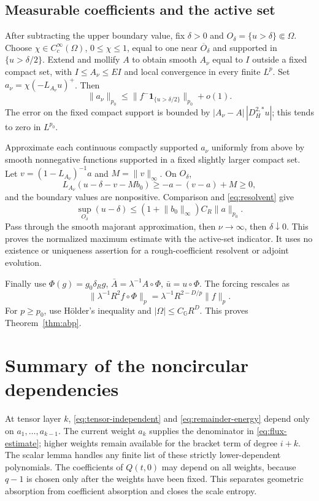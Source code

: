 \documentclass[11pt,a4paper]{amsart}
\numberwithin{equation}{section}
\theoremstyle{remark}\newtheorem{remark}[theorem]{Remark}
\newcommand{\G}{\mathbb G}
\newcommand{\norm}[1]{\lVert #1\rVert}
\begin{document}
\subsection{Measurable coefficients and the active set}
After subtracting the upper boundary value, fix $\delta>0$ and
$O_\delta=\{u>\delta\}\Subset\Omega$. Choose $\chi\in C_c^\infty(\Omega)$,
$0\le\chi\le1$, equal to one near $\overline O_\delta$ and supported in
$\{u>\delta/2\}$. Extend and mollify $A$ to obtain smooth $A_\nu$ equal to
$I$ outside a fixed compact set, with $I\le A_\nu\le EI$ and local convergence
in every finite $L^p$. Set $a_\nu=\chi(-L_{A_\nu}u)^+$. Then
\begin{equation}\label{eq:rough-limit}
 \norm{a_\nu}_{p_0}
 \le\norm{f^-\mathbf1_{\{u>\delta/2\}}}_{p_0}+o(1).
\end{equation}
The error on the fixed compact support is bounded by
$|A_\nu-A|\,|D_H^{2,*}u|$; this tends to zero in $L^{p_0}$.

Approximate each continuous compactly supported $a_\nu$ uniformly from above
by smooth nonnegative functions supported in a fixed slightly larger compact
set. Let $v=(1-L_{A_\nu})^{-1}a$ and $M=\norm v_\infty$. On $O_\delta$,
\[
 L_{A_\nu}(u-\delta-v-Mb_0)\ge-a-(v-a)+M\ge0,
\]
and the boundary values are nonpositive. Comparison and
\eqref{eq:resolvent} give
\[
 \sup_{O_\delta}(u-\delta)\le(1+\norm{b_0}_\infty)C_R\norm a_{p_0}.
\]
Pass through the smooth majorant approximation, then $\nu\to\infty$, then
$\delta\downarrow0$. This proves the normalized maximum estimate with the
active-set indicator. It uses no existence or uniqueness assertion for a
rough-coefficient resolvent or adjoint evolution.

Finally use $\Phi(g)=g_0\delta_Rg$, $\bar A=\lambda^{-1}A\circ\Phi$,
$\bar u=u\circ\Phi$. The forcing rescales as
\[
 \norm{\lambda^{-1}R^2f\circ\Phi}_p
 =\lambda^{-1}R^{2-D/p}\norm f_p.
\]
For $p\ge p_0$, use H\"older's inequality and $|\Omega|\le C_\G R^D$.
This proves Theorem~\ref{thm:abp}.

\section{Summary of the noncircular dependencies}
At tensor layer $k$, \eqref{eq:tensor-independent} and
\eqref{eq:remainder-energy} depend only on $a_1,\ldots,a_{k-1}$. The current
weight $a_k$ supplies the denominator in \eqref{eq:flux-estimate}; higher
weights remain available for the bracket term of degree $i+k$. The scalar
lemma handles any finite list of these strictly lower-dependent polynomials.
The coefficients of $Q(t,0)$ may depend on all weights, because $q-1$ is
chosen only after the weights have been fixed. This separates geometric
absorption from coefficient absorption and closes the scale entropy.
\end{document}
